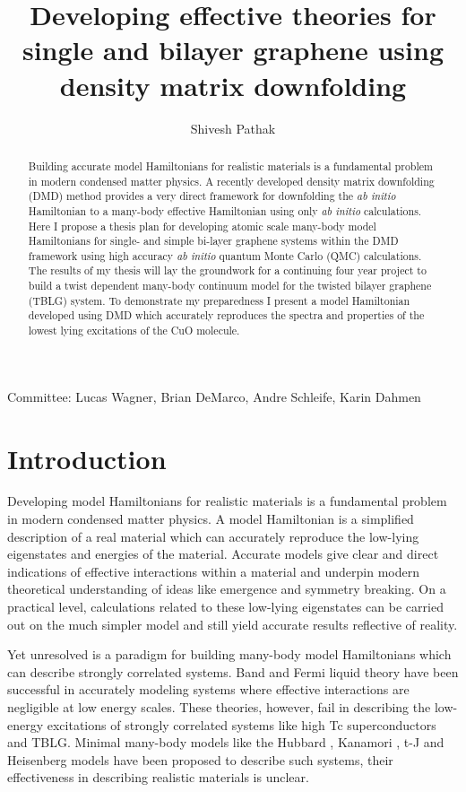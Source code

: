 \documentclass[12pt]{article}
\author{Shivesh Pathak}
\title{Developing effective theories for single and bilayer graphene using density matrix downfolding}
\begin{document}
\maketitle
\begin{abstract}
Building accurate model Hamiltonians for realistic materials is a fundamental problem in modern condensed matter physics.
A recently developed density matrix downfolding (DMD) \cite{Zheng2017} method provides a very direct framework for downfolding the \textit{ab initio} Hamiltonian to a many-body effective Hamiltonian using only \textit{ab initio} calculations. 
Here I propose a thesis plan for developing atomic scale many-body model Hamiltonians for single- and simple bi-layer graphene systems within the DMD framework using high accuracy \textit{ab initio} quantum Monte Carlo (QMC) calculations.
The results of my thesis will lay the groundwork for a continuing four year project to build a twist dependent many-body continuum model for the twisted bilayer graphene (TBLG) system.
To demonstrate my preparedness I present a model Hamiltonian developed using DMD which accurately reproduces the spectra and properties of the lowest lying excitations of the CuO molecule.
\end{abstract}
Committee: Lucas Wagner, Brian DeMarco, Andre Schleife, Karin Dahmen
\pagebreak

\section{Introduction}
Developing model Hamiltonians for realistic materials is a fundamental problem in modern condensed matter physics.
A model Hamiltonian is a simplified description of a real material which can accurately reproduce the low-lying eigenstates and energies of the material.
Accurate models give clear and direct indications of effective interactions within a material and underpin modern theoretical understanding of ideas like emergence and symmetry breaking.
On a practical level, calculations related to these low-lying eigenstates can be carried out on the much simpler model and still yield accurate results reflective of reality.

Yet unresolved is a paradigm for building many-body model Hamiltonians which can describe strongly correlated systems.
Band and Fermi liquid theory have been successful in accurately modeling systems where effective interactions are negligible at low energy scales.
These theories, however, fail in describing the low-energy excitations of strongly correlated systems like high Tc superconductors and TBLG.
Minimal many-body models like the Hubbard \cite{Hubbard1963}, Kanamori \cite{10.1143/PTP.30.275}, t-J \cite{Chao_1977} and Heisenberg models have been proposed to describe such systems, their effectiveness in describing realistic materials is unclear.
\end{document}
